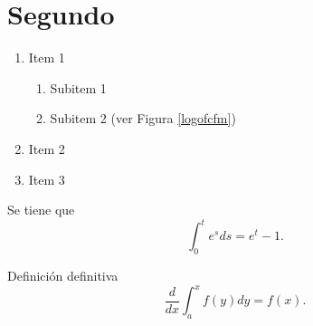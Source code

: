 \chapter{Segundo}
\lipsum[1-3]
    \lipsum[30-35]
	\begin{enumerate}
		\item Item 1
		\begin{enumerate}
			\item Subitem 1
			\item Subitem 2 (ver Figura \ref{logofcfm})
		\end{enumerate}
		\item Item 2
		\item Item 3
	\end{enumerate}
	\begin{teo}
	Se tiene que $$\int_0^t e^sds=e^t-1.$$
	\end{teo}
	\lipsum[36-40]
\begin{defn} Definición definitiva $$\frac{d}{dx}\int_a^xf(y)dy=f(x).$$\end{defn}
\lipsum[50-60]
